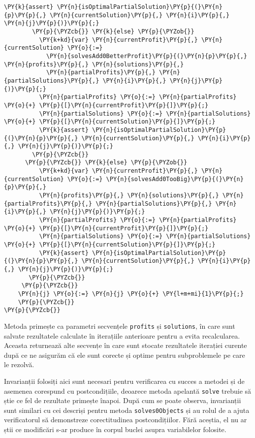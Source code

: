 \begin{sloppypar}
\begin{Verbatim}[commandchars=\\\{\}]
          \PY{k}{assert} \PY{n}{isOptimalPartialSolution}\PY{p}{(}\PY{n}{p}\PY{p}{,} \PY{n}{currentSolution}\PY{p}{,} \PY{n}{i}\PY{p}{,} \PY{n}{j}\PY{p}{)}\PY{p}{;}
        \PY{p}{\PYZcb{}} \PY{k}{else} \PY{p}{\PYZob{}}
          \PY{k+kd}{var} \PY{n}{currentProfit}\PY{p}{,} \PY{n}{currentSolution} \PY{o}{:=} 
            \PY{n}{solvesAdd0BetterProfit}\PY{p}{(}\PY{n}{p}\PY{p}{,} \PY{n}{profits}\PY{p}{,} \PY{n}{solutions}\PY{p}{,} 
            \PY{n}{partialProfits}\PY{p}{,} \PY{n}{partialSolutions}\PY{p}{,} \PY{n}{i}\PY{p}{,} \PY{n}{j}\PY{p}{)}\PY{p}{;}
          \PY{n}{partialProfits} \PY{o}{:=} \PY{n}{partialProfits} \PY{o}{+} \PY{p}{[}\PY{n}{currentProfit}\PY{p}{]}\PY{p}{;}
          \PY{n}{partialSolutions} \PY{o}{:=} \PY{n}{partialSolutions} \PY{o}{+} \PY{p}{[}\PY{n}{currentSolution}\PY{p}{]}\PY{p}{;}
          \PY{k}{assert} \PY{n}{isOptimalPartialSolution}\PY{p}{(}\PY{n}{p}\PY{p}{,} \PY{n}{currentSolution}\PY{p}{,} \PY{n}{i}\PY{p}{,} \PY{n}{j}\PY{p}{)}\PY{p}{;}
        \PY{p}{\PYZcb{}}
      \PY{p}{\PYZcb{}} \PY{k}{else} \PY{p}{\PYZob{}}
          \PY{k+kd}{var} \PY{n}{currentProfit}\PY{p}{,} \PY{n}{currentSolution} \PY{o}{:=} \PY{n}{solvesAdd0TooBig}\PY{p}{(}\PY{n}{p}\PY{p}{,} 
          \PY{n}{profits}\PY{p}{,} \PY{n}{solutions}\PY{p}{,} \PY{n}{partialProfits}\PY{p}{,} \PY{n}{partialSolutions}\PY{p}{,} \PY{n}{i}\PY{p}{,} \PY{n}{j}\PY{p}{)}\PY{p}{;}
          \PY{n}{partialProfits} \PY{o}{:=} \PY{n}{partialProfits} \PY{o}{+} \PY{p}{[}\PY{n}{currentProfit}\PY{p}{]}\PY{p}{;}
          \PY{n}{partialSolutions} \PY{o}{:=} \PY{n}{partialSolutions} \PY{o}{+} \PY{p}{[}\PY{n}{currentSolution}\PY{p}{]}\PY{p}{;}
          \PY{k}{assert} \PY{n}{isOptimalPartialSolution}\PY{p}{(}\PY{n}{p}\PY{p}{,} \PY{n}{currentSolution}\PY{p}{,} \PY{n}{i}\PY{p}{,} \PY{n}{j}\PY{p}{)}\PY{p}{;}
       \PY{p}{\PYZcb{}}
     \PY{p}{\PYZcb{}}
    \PY{n}{j} \PY{o}{:=} \PY{n}{j} \PY{o}{+} \PY{l+m+mi}{1}\PY{p}{;}
    \PY{p}{\PYZcb{}}
\PY{p}{\PYZcb{}}
\end{Verbatim} 
    \par Metoda primește ca parametri secvențele \texttt{profits} și \texttt{solutions}, în care sunt salvate rezultatele calculate în iterațiile anterioare pentru a evita recalcularea. Aceasta returnează alte secvențe în care sunt stocate rezultatele iterației curente după ce ne asigurăm că ele sunt corecte și optime pentru subproblemele pe care le rezolvă. \par
    Invarianții folosiți aici sunt necesari pentru verificarea cu succes a metodei și de asemenea corespund cu postcondițiile, deoarece metoda apelantă \texttt{solve} trebuie să știe ce fel de rezultate primește înapoi. După cum se poate observa, invarianții sunt similari cu cei descriși pentru metoda \texttt{solves0Objects} și au rolul de a ajuta verificatorul să demonstreze corectitudinea postcondițiilor. Fără aceștia, el nu ar știi ce modificări s-ar produce în corpul buclei asupra variabilelor folosite. \par

\end{sloppypar}
